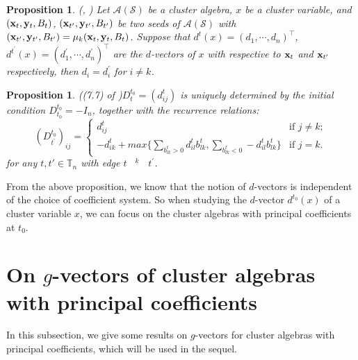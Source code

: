 \documentclass[14pt]{amsart}
\newtheorem{Proposition}[Theorem]{Proposition}
\begin{document}
\begin{Proposition}\label{prodvectors}
(\cite[Proposition 2.5]{RS}, \cite[Proposition 2.7]{CL1})
 Let $\mathcal A(\mathcal S)$ be a cluster algebra, $x$ be a cluster variable, and $({\bf x}_t,{\bf y}_t,B_t)$, $({\bf x}_{t^\prime}, {\bf y}_{t^\prime},B_{t^\prime})$ be two seeds of  $\mathcal A(\mathcal S)$
with $({\bf x}_{t^\prime}, {\bf y}_{t^\prime},B_{t^\prime})=\mu_k({\bf x}_t,{\bf y}_t,B_t)$. Suppose that $d^t(x)=(d_1,\cdots,d_n)^{\top}$, $d^{t^\prime}(x)=(d_1^\prime,\cdots,d_n^\prime)^{\top}$ are the $d$-vectors of $x$ with respective to ${\bf x}_t$ and ${\bf x}_{t^\prime}$ respectively, then $d_i=d_i^{\prime}$ for $i\neq k$.
\end{Proposition}



\begin{Proposition}((7.7) of \cite{FZ3})\label{prodrec}
$D_t^{t_0}=(d_{ij}^t)$ is uniquely determined by the initial condition $D_{t_0}^{t_0}=-I_n$, together with the recurrence relations:
\begin{equation}\label{mutationD}
(D_{t^{\prime}}^{t_0})_{ij}=\begin{cases}d_{ij}^t  & \text{if } j\neq k;\\ -d_{ik}^t+max\{\sum\limits_{b_{lk}^t>0}d_{il}^t b_{lk}^t, \sum\limits_{b_{lk}^t<0} -d_{il}^tb_{lk}^t\}  &\text{if } j=k.\end{cases}\nonumber
 \end{equation}
 for any $t,t'\in\mathbb T_n$ with edge $t^{~\underline{\quad k \quad}} ~t^{\prime}$.
\end{Proposition}


From the above proposition, we know that the notion of $d$-vectors is independent of the choice of coefficient system. So when studying the $d$-vector $d^{t_0}(x)$ of a cluster variable $x$, we can focus on the cluster algebras with principal coefficients at $t_0$.





 \vspace{5mm}




\section{On $g$-vectors of cluster algebras with principal coefficients}
In this subsection, we give some results  on $g$-vectors for cluster algebras with principal coefficients, which will be  used in the sequel.
\end{document}
